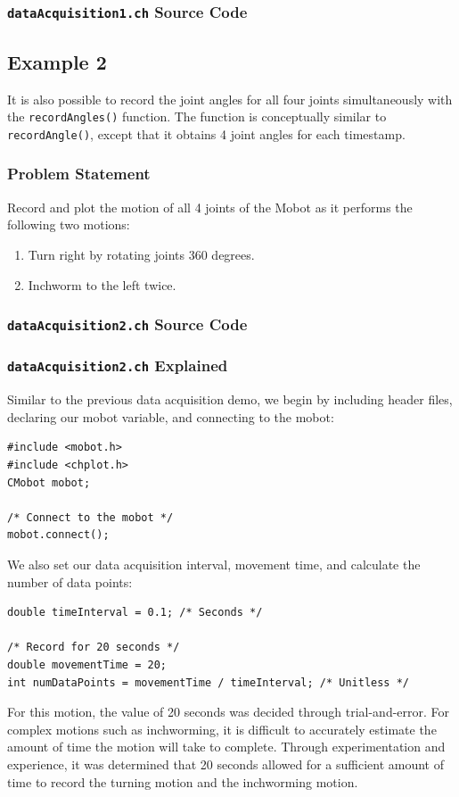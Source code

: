 \documentclass{article}
\begin{document}
\subsubsection{\texttt{dataAcquisition1.ch} Source Code}


\subsection{Example 2}
It is also possible to record the joint angles for all four joints simultaneously
with the \texttt{recordAngles()} function. The function is conceptually similar
to \texttt{recordAngle()}, except that it obtains 4 joint angles for each timestamp.

\subsubsection{Problem Statement}
Record and plot the motion of all 4 joints of the Mobot as it performs the
following two motions:
\begin{enumerate}
\item Turn right by rotating joints 360 degrees.
\item Inchworm to the left twice.
\end{enumerate}

\subsubsection{\texttt{dataAcquisition2.ch} Source Code}


\subsubsection{\texttt{dataAcquisition2.ch} Explained}
Similar to the previous data acquisition demo, we begin by including
header files, declaring our mobot variable, and connecting to the mobot:
\begin{verbatim}
#include <mobot.h>
#include <chplot.h>
CMobot mobot;

/* Connect to the mobot */
mobot.connect();
\end{verbatim}

We also set our data acquisition interval, movement time, and calculate
the number of data points:
\begin{verbatim}
double timeInterval = 0.1; /* Seconds */

/* Record for 20 seconds */
double movementTime = 20;
int numDataPoints = movementTime / timeInterval; /* Unitless */
\end{verbatim}
For this motion, the value of 20 seconds was decided through trial-and-error.
For complex motions such as inchworming, it is difficult to accurately estimate the 
amount of time the motion will take to complete. Through experimentation and experience,
it was determined that 20 seconds allowed for a sufficient amount of time to record the 
turning motion and the inchworming motion. 
\end{document}

